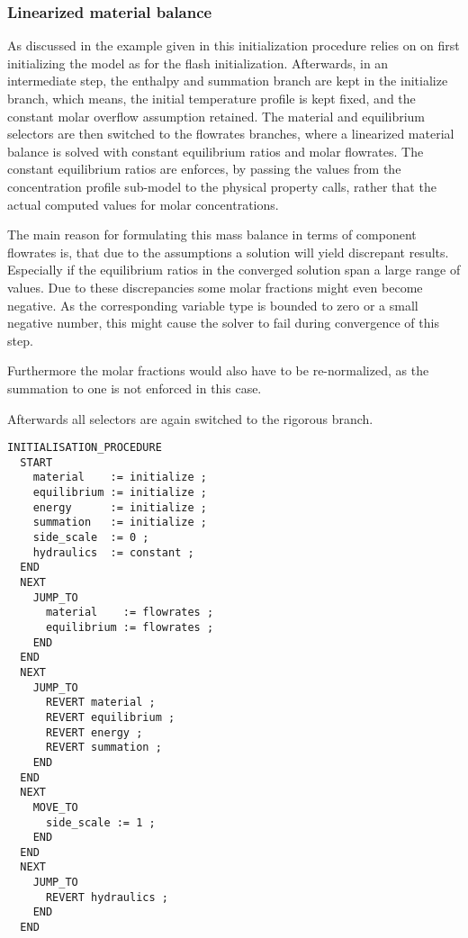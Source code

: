     \subsubsection{Linearized material balance}
        As discussed in the example given in  this initialization
        procedure relies on on first initializing the model as for the flash initialization. Afterwards,
        in an intermediate step, the enthalpy and summation branch are kept in the initialize branch,
        which means, the initial temperature profile is kept fixed, and the constant molar overflow assumption
        retained. The material and equilibrium selectors are then switched to the flowrates branches, where
        a linearized material balance is solved with constant equilibrium ratios and molar flowrates.
        The constant equilibrium ratios are enforces, by passing the values from the concentration profile
        sub-model to the physical property calls, rather that the actual computed values for molar
        concentrations.

        The main reason for formulating this mass balance in terms of component flowrates is, that due to
        the assumptions a solution will yield discrepant results. Especially if the equilibrium ratios
        in the converged solution span a large range of values. Due to these discrepancies some
        molar fractions might even become negative. As the corresponding variable type is bounded to zero
        or a small negative number, this might cause the solver to fail during convergence of this step.

        Furthermore the molar fractions would also have to be re-normalized, as the summation to one
        is not enforced in this case.

        Afterwards all selectors are again switched to the rigorous branch.

\begin{lstlisting}
INITIALISATION_PROCEDURE
  START
    material    := initialize ;
    equilibrium := initialize ;
    energy      := initialize ;
    summation   := initialize ;
    side_scale  := 0 ;
    hydraulics  := constant ;
  END
  NEXT
    JUMP_TO
      material    := flowrates ;
      equilibrium := flowrates ;
    END
  END
  NEXT
    JUMP_TO
      REVERT material ;
      REVERT equilibrium ;
      REVERT energy ;
      REVERT summation ;
    END
  END
  NEXT
    MOVE_TO
      side_scale := 1 ;
    END
  END
  NEXT
    JUMP_TO
      REVERT hydraulics ;
    END
  END
\end{lstlisting}



